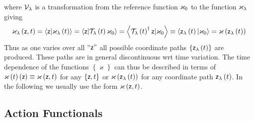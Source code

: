 where ${\cal V}_{\lambda }$ is a transformation from the reference function $%
{\bf \varkappa }_{0}$ to the function ${\bf \varkappa }_{\lambda }$ giving 
\begin{equation}
\varkappa _{\lambda }\left( {\sf z},t\right) =\left\langle {\sf z}|{\bf %
\varkappa }_{\lambda }\left( t\right) \right\rangle =\left\langle {\sf z}|%
{\cal T}_{\lambda }\left( t\right) {\bf \varkappa }_{0}\right\rangle
=\left\langle {\cal T}_{\lambda }\left( t\right) ^{\dagger }{\sf z}|{\bf %
\varkappa }_{0}\right\rangle \equiv \left\langle {\sf z}_{\lambda }\left(
t\right) |{\bf \varkappa }_{0}\right\rangle =\varkappa \left( {\sf z}%
_{\lambda }\left( t\right) \right)
\end{equation}%
Thus as one varies over all {\sf ''}${\sf z"}$ all possible coordinate paths 
$\left\{ {\sf z}_{\lambda }\left( t\right) \right\} $ are produced. These
paths are in general discontinuous wrt time variation. The time dependence
of the functions $\left\{ \varkappa \right\} $ can thus be described in
terms of ${\bf \varkappa }\left( t\right) \left( {\sf z}\right) \equiv
\varkappa \left( {\sf z},t\right) $ for any $\left\{ {\sf z},t\right\} $ or $%
\varkappa \left( {\sf z}_{\lambda }\left( t\right) \right) $ for any
coordinate path ${\sf z}_{\lambda }\left( t\right) $. In the following we
usually use the form $\varkappa \left( {\sf z},t\right) $.

\subsection{Action Functionals}

